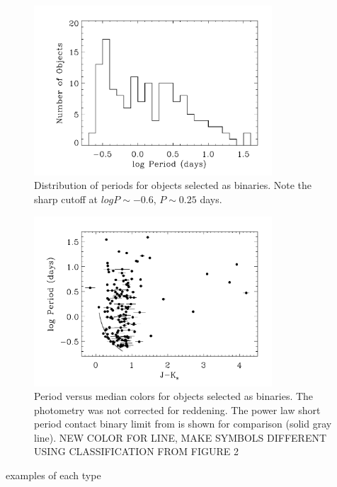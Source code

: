 \documentclass[]{emulateapj}
\begin{document}
\begin{figure}[]
\centering
\includegraphics[width=3.5in]{new_plots/bb_perhist}
\caption{Distribution of periods for objects selected as binaries. Note the sharp cutoff at $log P \sim -0.6$, $P \sim 0.25$ days.}
\label{perhist}
\end{figure}



\begin{figure}[!h]
\centering
\includegraphics[width=3.5in]{new_plots/color_period_bb}
\caption{Period versus median colors for objects selected as binaries. The photometry was not corrected for reddening. The power law short period contact binary limit from \cite{deb2011} is shown for comparison (solid gray line). NEW COLOR FOR LINE, MAKE SYMBOLS DIFFERENT USING CLASSIFICATION FROM FIGURE 2}
\label{periods}
\end{figure}


examples of each type
\end{document}
